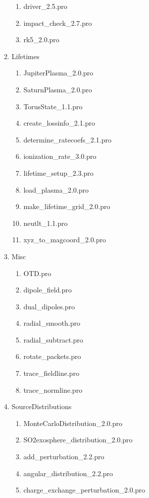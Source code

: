 \documentclass[11pt]{article}
\begin{document}
\begin{enumerate}
\begin{enumerate}
    \begin{enumerate}
    \item driver\_2.5.pro
    \item impact\_check\_2.7.pro
    \item rk5\_2.0.pro
    \end{enumerate}
  \item {\color{blue}Lifetimes}
    \begin{enumerate}
    \item JupiterPlasma\_2.0.pro
    \item SaturnPlasma\_2.0.pro
    \item TorusState\_1.1.pro
    \item create\_lossinfo\_2.1.pro
    \item determine\_ratecoefs\_2.1.pro
    \item ionization\_rate\_3.0.pro
    \item lifetime\_setup\_2.3.pro
    \item load\_plasma\_2.0.pro
    \item make\_lifetime\_grid\_2.0.pro
    \item neutlt\_1.1.pro
    \item xyz\_to\_magcoord\_2.0.pro
    \end{enumerate}
  \item {\color{blue}Misc}
    \begin{enumerate}
    \item OTD.pro
    \item dipole\_field.pro
    \item dual\_dipoles.pro
    \item radial\_smooth.pro
    \item radial\_subtract.pro
    \item rotate\_packets.pro
    \item trace\_fieldline.pro
    \item trace\_normline.pro
    \end{enumerate}
  \item {\color{blue}SourceDistributions}
    \begin{enumerate}
    \item MonteCarloDistribution\_2.0.pro
    \item SO2exosphere\_distribution\_2.0.pro
    \item add\_perturbation\_2.2.pro
    \item angular\_distribution\_2.2.pro
    \item charge\_exchange\_perturbation\_2.0.pro

\end{enumerate}
\end{enumerate}
\end{enumerate}
\end{document}
